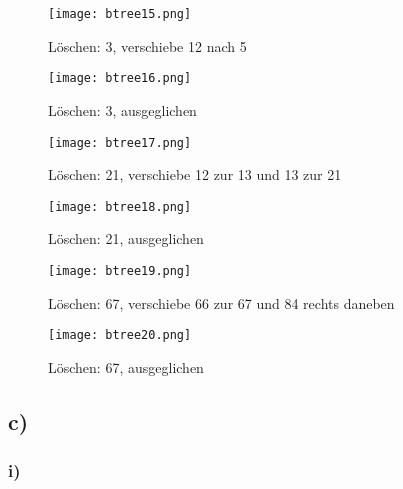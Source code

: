 \documentclass[a4paper]{article}
\begin{document}
\begin{figure}[!h]
	\begin{center}
		\texttt{[image: btree15.png]}
	\end{center}
	\caption{Löschen: 3, verschiebe 12 nach 5}
	\label{fig:btree15}
\end{figure}

\begin{figure}[!h]
	\begin{center}
		\texttt{[image: btree16.png]}
	\end{center}
	\caption{Löschen: 3, ausgeglichen}
	\label{fig:btree16}
\end{figure}

\begin{figure}[!h]
	\begin{center}
		\texttt{[image: btree17.png]}
	\end{center}
	\caption{Löschen: 21, verschiebe 12 zur 13 und 13 zur 21}
	\label{fig:btree17}
\end{figure}

\begin{figure}[!h]
	\begin{center}
		\texttt{[image: btree18.png]}
	\end{center}
	\caption{Löschen: 21, ausgeglichen}
	\label{fig:btree18}
\end{figure}

\begin{figure}[!h]
	\begin{center}
		\texttt{[image: btree19.png]}
	\end{center}
	\caption{Löschen: 67, verschiebe 66 zur 67 und 84 rechts daneben}
	\label{fig:btree19}
\end{figure}

\begin{figure}[!h]
	\begin{center}
		\texttt{[image: btree20.png]}
	\end{center}
	\caption{Löschen: 67, ausgeglichen}
	\label{fig:btree20}
\end{figure}

\clearpage
\subsection*{c)}
\subsubsection*{i)}
\end{document}
